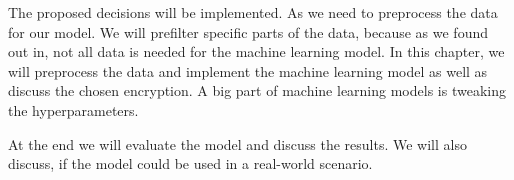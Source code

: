 The proposed decisions will be implemented.
As we need to preprocess the data for our model.
We will prefilter specific parts of the data, because as we found out in, not all data is needed for the machine learning model.
In this chapter, we will preprocess the data and implement the machine learning model as well as discuss the chosen encryption. 
A big part of machine learning models is tweaking the hyperparameters.

At the end we will evaluate the model and discuss the results.
We will also discuss, if the model could be used in a real-world scenario.

